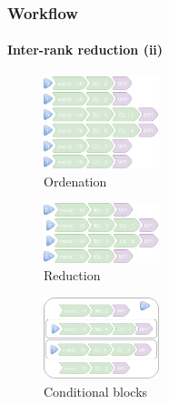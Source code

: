 \documentclass{beamer}
\begin{document}
\begin{frame}
\frametitle{Workflow}
\framesubtitle{Inter-rank reduction (ii)}
\begin{multicols}{3}
	\vfill
	\begin{figure}
		\includegraphics[width=0.3\textwidth]{imgs/workflow_ranks_1.png}
		\caption{Ordenation}
	\end{figure}
	\columnbreak
	\pause
	\begin{figure}
		\includegraphics[width=0.3\textwidth]{imgs/workflow_ranks_2.png}
		\caption{Reduction}
	\end{figure}
	\columnbreak
	\pause
	\begin{figure}
		\includegraphics[width=0.3\textwidth]{imgs/workflow_ranks_3.png}
		\caption{Conditional blocks}
	\end{figure}
\end{multicols}
\end{frame}
\end{document}
